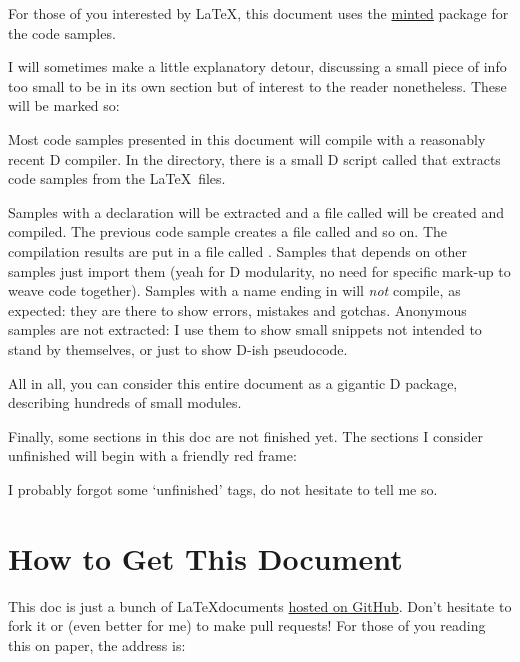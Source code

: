 For those of you interested by \LaTeX, this document uses the \href{http://code.google.com/p/minted/}{minted} package for the code samples. 

I will sometimes make a little explanatory detour, discussing a small piece of info too small to be in its own section but of interest to the reader nonetheless. These will be marked so:

{Most code samples presented in this document will compile with a reasonably recent D compiler. In the  directory, there is a small D script called  that extracts code samples from the \LaTeX\ files.

Samples with a  declaration will be extracted and a file called  will be created and compiled. The previous code sample creates a file called  and so on. The compilation results are put in a file called . Samples that depends on other samples just import them (yeah for D modularity, no need for specific mark-up to weave code together). Samples with a name ending in  will \emph{not} compile, as expected: they are there to show errors, mistakes and gotchas. Anonymous samples are not extracted: I use them to show small snippets not intended to stand by themselves, or just to show D-ish pseudocode.

All in all, you can consider this entire document as a gigantic D package, describing hundreds of small modules.}

Finally, some sections in this doc are not finished yet. The sections I consider unfinished will begin with a friendly red frame:


I probably forgot some `unfinished' tags, do not hesitate to tell me so.

\section*{How to Get This Document}\label{howtoget}

This doc is just a bunch of \LaTeX documents \href{http://github.com/PhilippeSigaud/D-templates-tutorial}{hosted on GitHub}. Don't hesitate to fork it or (even better for me) to make pull requests! For those of you reading this on paper, the address is:

